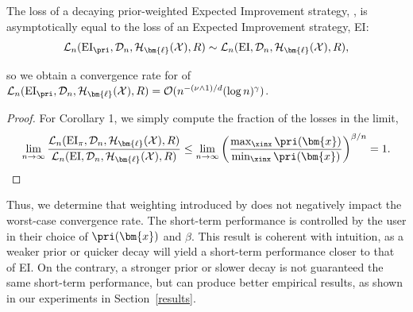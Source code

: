 \begin{corollary} The loss of a decaying prior-weighted Expected Improvement strategy, \pei, is asymptotically equal to the loss of an Expected Improvement strategy, EI:
\begin{equation}
    \mathcal{L}_{n}(\text{EI}_\pri, \mathcal{D}_n, \mathcal{H}_{\bm{\ell}}(\mathcal{X}), R) \sim  \mathcal{L}_{n}(\text{EI}, \mathcal{D}_n, \mathcal{H}_{\bm{\ell}}(\mathcal{X}), R),
\end{equation}

so we obtain a convergence rate for \pei{} of $\mathcal{L}_{n}(\text{EI}_\pri, \mathcal{D}_n, \mathcal{H}_{\bm{\ell}}(\mathcal{X}), R) = \mathcal{O}(n^{-(\nu \land 1)/d}(\log n)^\gamma)$.
\end{corollary}
\begin{proof}
For Corollary 1, we simply compute the fraction of the losses in the limit,
\begin{equation}
    \lim_{n \to \infty}\frac{\mathcal{L}_n(\text{EI}_\pi, \mathcal{D}_n, \mathcal{H}_{\bm{\ell}}(\mathcal{X}), R)}{\mathcal{L}_n(\text{EI}, \mathcal{D}_n, \mathcal{H}_{\bm{\ell}}(\mathcal{X}), R)} \le \lim_{n \to \infty} \left(\frac{\max_{\xinx}\pri(\bm{x})}{\min_{\xinx}\pri(\bm{x})}\right)^{\beta/n} =1.
\end{equation}
\end{proof}
Thus, we determine that weighting introduced by \pei{} does not negatively impact the worst-case convergence rate. The short-term performance is controlled by the user in their choice of $\pri(\bm{x})$ and $\beta$. This result is coherent with intuition, as a weaker prior or quicker decay will yield a short-term performance closer to that of EI. On the contrary, a stronger prior or slower decay is not guaranteed the same short-term performance, but can produce better empirical results, as shown in our experiments in Section~\ref{results}.
